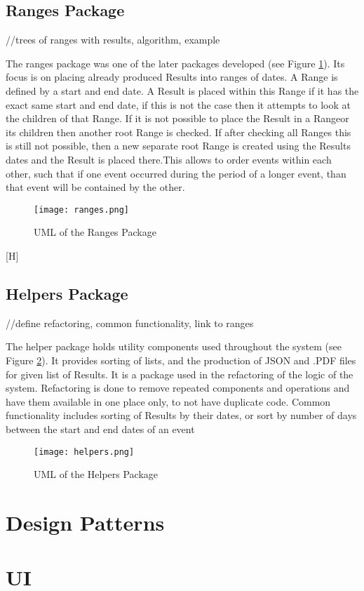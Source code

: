 \subsection{Ranges Package}
//trees of ranges with results, algorithm, example
\par The ranges package was one of the later packages developed (see Figure \ref{fig:ranges}). Its focus is on placing already produced Results into ranges of dates. A Range is defined by a start and end date. A Result is placed within this Range if it has the exact same start and end date, if this is not the case then it attempts to look at the children of that Range. If it is not possible to place the Result in a Rangeor its children then another root Range is checked. If after checking all Ranges this is still not possible, then a new separate root Range is created using the Results dates and the Result is placed there.This allows to order events within each other, such that if one event occurred during the period of a longer event, than that event will be contained by the other. 
\begin{figure}
\caption{UML of the Ranges Package}
\label{fig:ranges}
\texttt{[image: ranges.png]}
\end{figure}[H]
\subsection{Helpers Package}
//define refactoring, common functionality, link to ranges
\par The helper package holds utility components used throughout the system (see Figure \ref{fig:helpers}). It provides sorting of lists, and the production of JSON and .PDF files for given list of Results. It is a package used in the refactoring of the logic of the system. Refactoring is done to remove repeated components and operations and have them available in one place only, to not have duplicate code. Common functionality includes sorting of Results by their dates, or sort by number of days between the start and end dates of an event
\begin{figure}[H]
\caption{UML of the Helpers Package}
\label{fig:helpers}
\texttt{[image: helpers.png]}
\end{figure}
\section{Design Patterns}
\section{UI}










